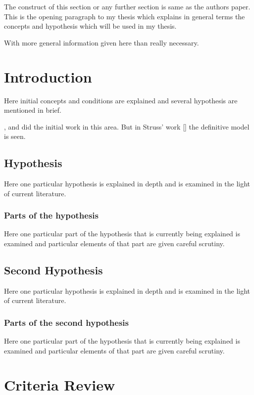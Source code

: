 \documentclass[
  12pt,
  notitlepage]{isuthesis}
\begin{document}
The construct of this section or any further section is same as the authors paper.
This is the opening paragraph to my thesis which
explains in general terms the concepts and hypothesis
which will be used in my thesis.

With more general information given here than really
necessary.

\section{Introduction}

Here initial concepts and conditions are explained and
several hypothesis are mentioned in brief.

\cite{allen}, \cite{bruner} and \cite{cox}
did the initial work in this area. But in Struss' work {[}\cite{struss}{]}
the definitive model is seen.

\subsection{Hypothesis}

Here one particular hypothesis is explained in depth
and is examined in the light of current literature.

\subsubsection{Parts of the hypothesis}

Here one particular part of the hypothesis that is
currently being explained is examined and particular
elements of that part are given careful scrutiny.

\subsection{Second Hypothesis}

Here one particular hypothesis is explained in depth
and is examined in the light of current literature.

\subsubsection{Parts of the second hypothesis}

Here one particular part of the hypothesis that is
currently being explained is examined and particular
elements of that part are given careful scrutiny.

\section{Criteria Review}
\end{document}
